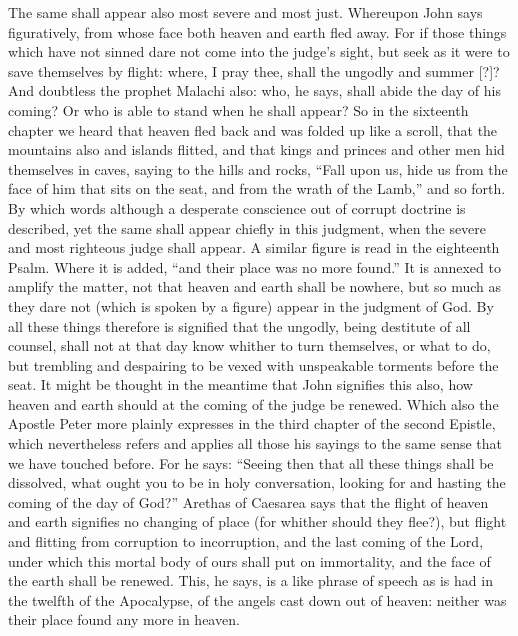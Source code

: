 The same shall appear also most severe and most just. Whereupon John says figuratively, from whose face both heaven and earth fled away. For if those things which have not sinned dare not come into the judge’s sight, but seek as it were to save themselves by flight: where, I pray thee, shall the ungodly and summer [?]? And doubtless the prophet Malachi also: who, he says, shall abide the day of his coming? Or who is able to stand when he shall appear? So in the sixteenth chapter we heard that heaven fled back and was folded up like a scroll, that the mountains also and islands flitted, and that kings and princes and other men hid themselves in caves, saying to the hills and rocks, “Fall upon us, hide us from the face of him that sits on the seat, and from the wrath of the Lamb,” and so forth. By which words although a desperate conscience out of corrupt doctrine is described, yet the same shall appear chiefly in this judgment, when the severe and most righteous judge shall appear. A similar figure is read in the eighteenth Psalm. Where it is added, “and their place was no more found.” It is annexed to amplify the matter, not that heaven and earth shall be nowhere, but so much as they dare not (which is spoken by a figure) appear in the judgment of God. By all these things therefore is signified that the ungodly, being destitute of all counsel, shall not at that day know whither to turn themselves, or what to do, but trembling and despairing to be vexed with unspeakable torments before the seat. It might be thought in the meantime that John signifies this also, how heaven and earth should at the coming of the judge be renewed. Which also the Apostle Peter more plainly expresses in the third chapter of the second Epistle, which nevertheless refers and applies all those his sayings to the same sense that we have touched before. For he says: “Seeing then that all these things shall be dissolved, what ought you to be in holy conversation, looking for and hasting the coming of the day of God?” Arethas of Caesarea says that the flight of heaven and earth signifies no changing of place (for whither should they flee?), but flight and flitting from corruption to incorruption, and the last coming of the Lord, under which this mortal body of ours shall put on immortality, and the face of the earth shall be renewed. This, he says, is a like phrase of speech as is had in the twelfth of the Apocalypse, of the angels cast down out of heaven: neither was their place found any more in heaven.

